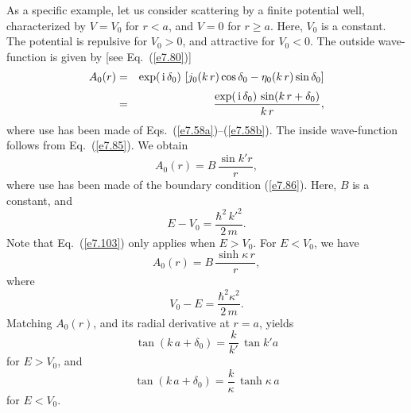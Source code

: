 As a specific example, let us consider scattering by  a finite
potential well, characterized by $V=V_0$ for $r<a$, and
$V=0$ for $r\geq a$. Here, $V_0$ is a constant. The potential
is repulsive for $V_0>0$, and attractive for $V_0<0$. 
The outside wave-function is given by [see Eq.~(\ref{e7.80})]
\begin{eqnarray}
A_0(r) &=& \exp(\,{\rm i}\, \delta_0)\,\left[
j_0(k\,r) \cos\delta_0 - \eta_0(k\,r) \sin\delta_0\right]\nonumber\\[0.5ex]
&=& \frac{ \exp(\,{\rm i} \,\delta_0)\, \sin(k\,r+\delta_0)}{k\,r},
\end{eqnarray}
where use has been made of Eqs.~(\ref{e7.58a})--(\ref{e7.58b}).
The inside wave-function follows from Eq.~(\ref{e7.85}). We obtain
\begin{equation}\label{e7.103}
A_0(r) = B \,\frac{\sin k'r}{r},
\end{equation}
where use has been made of the boundary condition (\ref{e7.86}).
Here, $B$ is a constant, and 
\begin{equation}
E - V_0 = \frac{\hbar^2 \,k'^2}{2\,m}.
\end{equation}
Note that Eq.~(\ref{e7.103}) only applies when $E>V_0$. For $E<V_0$, we have
\begin{equation}
A_0(r) = B \,\frac{\sinh\kappa\, r}{r},
\end{equation}
where
\begin{equation}
V_0 - E = \frac{\hbar^2 \kappa^2}{2\,m}.
\end{equation}
Matching $A_0(r)$, and its radial derivative at $r=a$, yields
\begin{equation}\label{e7.107}
\tan(k\,a+\delta_0) = \frac{k}{k'} \,\tan k'a
\end{equation}
for $E>V_0$, and
\begin{equation}
\tan(k\,a+ \delta_0) = \frac{k}{\kappa} \,\tanh \kappa\, a
\end{equation}
for $E<V_0$.

